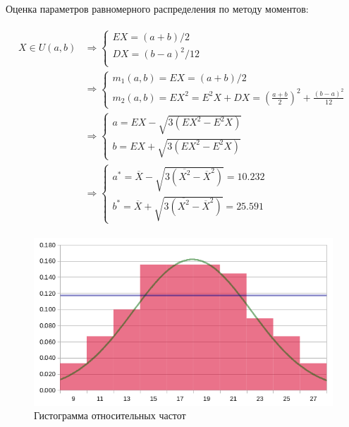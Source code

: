 \documentclass[12pt, a4paper]{article}
\begin{document}
\noindent Оценка параметров равномерного распределения по методу моментов:

\begin{align*}
  \begin{split}
    X \in U(a, b) 
        &\Rightarrow 
        \begin{cases} 
          EX = (a + b) / 2 \\
          DX = (b - a)^2 / 12 \\
        \end{cases} \\
        &\Rightarrow
        \begin{cases} 
          m_1(a, b) = EX = (a + b) / 2 \\
          m_2(a, b) = EX^2 = E^2X + DX = \left(\frac{a + b}{2}\right)^2 + \frac{(b - a)^2}{12}
        \end{cases} \\
        &\Rightarrow
        \begin{cases} 
          a = EX - \sqrt{3(EX^2 - E^2X)} \\
          b = EX + \sqrt{3(EX^2 - E^2X)}
        \end{cases} \\
        &\Rightarrow
        \begin{cases} 
          a^* = \overline{X} - \sqrt{3(\overline{X^2} - \overline{X}^2)} = 10.232 \\
          b^* = \overline{X} + \sqrt{3(\overline{X^2} - \overline{X}^2)} = 25.591
        \end{cases}
  \end{split}
\end{align*}

\begin{figure}[H]
\centering
\includegraphics[scale=0.55]{3.png}
\caption{Гистограмма относительных частот}
\end{figure}
\vspace{5mm}
\end{document}
